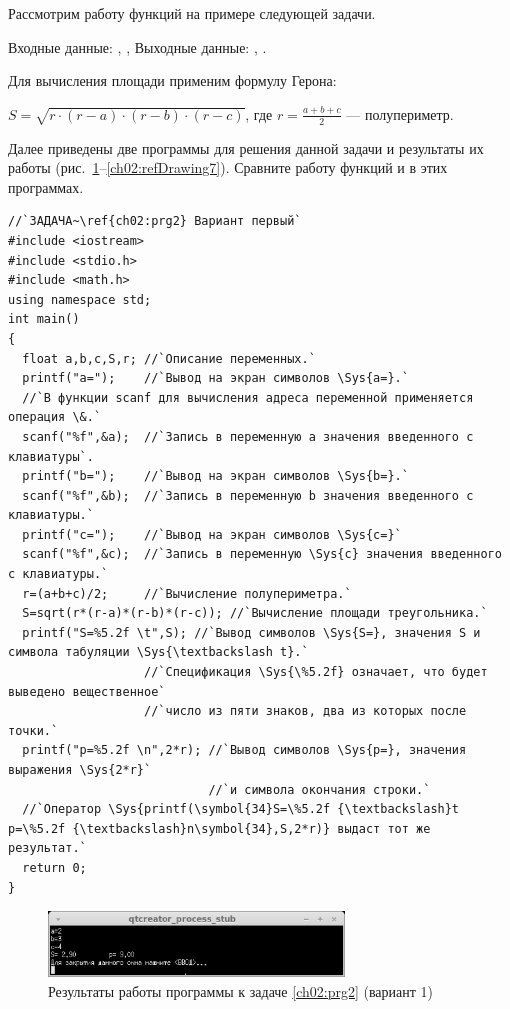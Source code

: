 Рассмотрим работу функций на примере следующей задачи.


Входные данные: , ,  Выходные данные:
, . 

Для вычисления площади применим формулу Герона:

$S=\sqrt{r\cdot (r-a)\cdot (r-b)\cdot (r-c)}$, где $r=\frac{a+b+c}{2}$ --- полупериметр.

Далее приведены две программы для решения данной задачи и результаты их работы 
(рис.~\ref{ch02:refDrawing6}--\ref{ch02:refDrawing7}).
Сравните работу функций  и  в этих программах.
\begin{lstlisting}
//`ЗАДАЧА~\ref{ch02:prg2} Вариант первый`
#include <iostream>
#include <stdio.h>
#include <math.h>
using namespace std;
int main()
{
  float a,b,c,S,r; //`Описание переменных.`
  printf("a=");	   //`Вывод на экран символов \Sys{a=}.`
  //`В функции scanf для вычисления адреса переменной применяется операция \&.`
  scanf("%f",&a);  //`Запись в переменную а значения введенного с клавиатуры`.
  printf("b=");    //`Вывод на экран символов \Sys{b=}.`
  scanf("%f",&b);  //`Запись в переменную b значения введенного с клавиатуры.`
  printf("c=");    //`Вывод на экран символов \Sys{c=}`
  scanf("%f",&c);  //`Запись в переменную \Sys{c} значения введенного с клавиатуры.`
  r=(a+b+c)/2;     //`Вычисление полупериметра.`
  S=sqrt(r*(r-a)*(r-b)*(r-c)); //`Вычисление площади треугольника.`
  printf("S=%5.2f \t",S); //`Вывод символов \Sys{S=}, значения S и символа табуляции \Sys{\textbackslash t}.`
                   //`Спецификация \Sys{\%5.2f} означает, что будет выведено вещественное` 
                   //`число из пяти знаков, два из которых после точки.`
  printf("p=%5.2f \n",2*r); //`Вывод символов \Sys{p=}, значения выражения \Sys{2*r}` 
                            //`и символа окончания строки.`
  //`Оператор \Sys{printf(\symbol{34}S=\%5.2f {\textbackslash}t p=\%5.2f {\textbackslash}n\symbol{34},S,2*r)} выдаст тот же результат.`
  return 0;
}
\end{lstlisting}

\begin{figure}[htb]
\begin{center}
\includegraphics[width=0.7\textwidth]{img/ris_2_7}
\caption{Результаты работы программы к задаче \ref{ch02:prg2} (вариант 1)}
\label{ch02:refDrawing6}
\end{center}
\end{figure}

